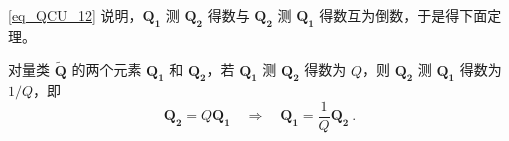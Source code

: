 \autoref{eq_QCU_12} 说明，$\boldsymbol{Q_1}$ 测 $\boldsymbol{Q_2}$ 得数与 $\boldsymbol{Q_2}$ 测 $\boldsymbol{Q_1}$ 得数互为倒数，于是得下面定理。
\begin{theorem}{}
对量类 $\tilde{\boldsymbol{Q}}$ 的两个元素 $\boldsymbol{Q_1}$ 和 $\boldsymbol{Q_2}$，若 $\boldsymbol{Q_1}$ 测 $\boldsymbol{Q_2}$ 得数为 $Q$，则 $\boldsymbol{Q_2}$ 测 $\boldsymbol{Q_1}$ 得数为 $1/Q$，即
\begin{equation}
\boldsymbol{Q_2}=Q\boldsymbol{Q_1}\quad\Rightarrow\quad\boldsymbol{Q_1}=\frac{1}{Q}\boldsymbol{Q_2}~.
\end{equation}
\end{theorem}